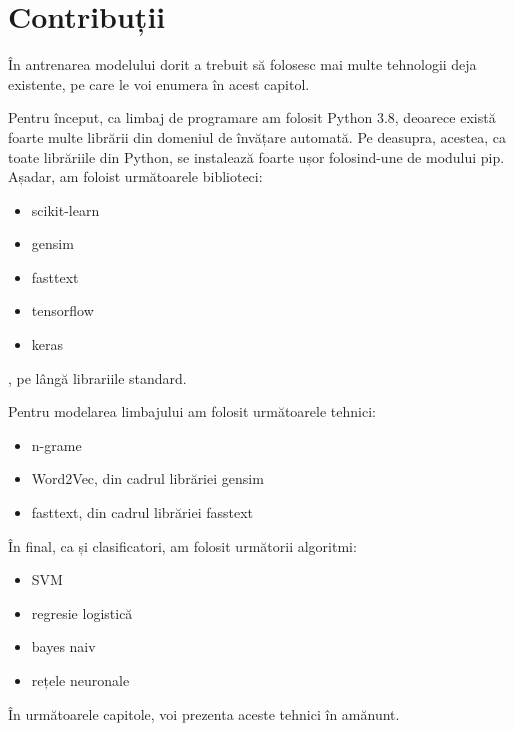 \chapter*{Contribuții} 

În antrenarea modelului dorit a trebuit să folosesc mai multe tehnologii deja existente, pe care
le voi enumera în acest capitol.

Pentru început, ca limbaj de programare am folosit Python 3.8, deoarece există foarte multe librării din domeniul de învățare 
automată. Pe deasupra, acestea, ca toate librăriile din Python, se instalează foarte ușor folosind-une de modului pip. Așadar,
am foloist următoarele biblioteci:
\begin{itemize}
    \item scikit-learn
    \item gensim
    \item fasttext
    \item tensorflow
    \item keras
\end{itemize}
, pe lângă librariile standard.


Pentru modelarea limbajului am folosit următoarele tehnici:
\begin{itemize}
    \item n-grame
    \item Word2Vec, din cadrul librăriei gensim
    \item fasttext, din cadrul librăriei fasstext
\end{itemize}

În final, ca și clasificatori, am folosit următorii algoritmi:
\begin{itemize}
    \item SVM
    \item regresie logistică
    \item bayes naiv
    \item rețele neuronale
\end{itemize}

În următoarele capitole, voi prezenta aceste tehnici în amănunt.